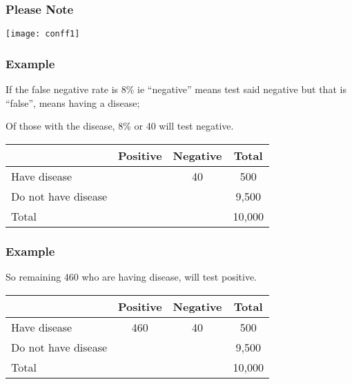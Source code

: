 \begin{frame}
\frametitle{Please Note}
\begin{center}
\texttt{[image: conff1]}
\end{center}
\end{frame}
\begin{frame}
\frametitle{Example}
If the false negative rate is 8\% ie ``negative'' means test said negative but that is ``false'', means having a disease; 

\vspace{.1in}
Of those with the disease, 8\% or 40 will test negative.\\ 
\begin{center}
\begin{tabular}{|l|c|c|c|}
\hline
& Positive & Negative &Total\\
\hline
Have disease & &40&500\\
\hline
Do not have disease && &9,500\\
\hline
Total &&&10,000\\
\hline
\end{tabular}
\end{center}
\end{frame}

\begin{frame}
\frametitle{Example}

\vspace{.1in}
So remaining 460 who are having disease, will test positive.\\ 
\begin{center}
\begin{tabular}{|l|c|c|c|}
\hline
& Positive & Negative &Total\\
\hline
Have disease &460 &40&500\\
\hline
Do not have disease && &9,500\\
\hline
Total &&&10,000\\
\hline
\end{tabular}
\end{center}
\end{frame}

